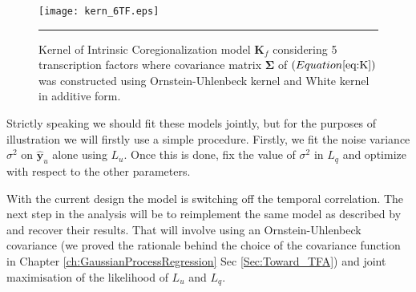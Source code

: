 \begin{figure}[t]
	\centering
		\texttt{[image: kern\_6TF.eps]}
		\rule{35em}{0.5pt}
	\caption[Kernel of Intrinsic Coregionalization model $\textbf{K}_f$ considering 5 transcription factors where covariance matrix $\boldsymbol{\Sigma}$ was constructed using Ornstein-Uhlenbeck kernel and White kernel in additive form] {Kernel of Intrinsic Coregionalization model $\textbf{K}_f$ considering 5 transcription factors where covariance matrix $\boldsymbol{\Sigma}$ of $\left( Equation \ref{eq:K} \right)$ was constructed using Ornstein-Uhlenbeck kernel and White kernel in additive form.}
	\label{fig:kern_6TF}
\end{figure}

Strictly speaking we should fit these models jointly, but for the purposes of illustration we will firstly use a simple procedure. Firstly, we fit the noise variance $\sigma^2$ on $\hat{\mathbf{y}}_u$ alone using $L_u$. Once this is done, fix the value of $\sigma^2$ in $L_q$ and optimize with respect to the other parameters.

With the current design the model is switching off the temporal correlation. The next step in the analysis will be to reimplement the same model as described by \cite{Sanguinetti:2006} and recover their results. That will involve using an Ornstein-Uhlenbeck covariance (we proved the rationale behind the choice of the covariance function in Chapter \ref{ch:GaussianProcessRegression} Sec \ref{Sec:Toward_TFA}) and joint maximisation of the likelihood of $L_u$ and $L_q$.

